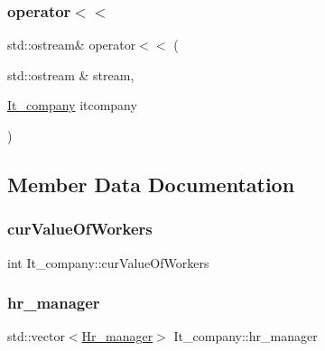 \subsubsection{\texorpdfstring{operator$<$$<$}{operator<<}}
{\footnotesize\ttfamily std\+::ostream\& operator$<$$<$ (\begin{DoxyParamCaption}\item[{std\+::ostream \&}]{stream,  }\item[{\hyperlink{class_it__company}{It\+\_\+company}}]{itcompany }\end{DoxyParamCaption})\hspace{0.3cm}{\ttfamily [friend]}}



\subsection{Member Data Documentation}
\hypertarget{class_it__company_ac48dbef2db2cad83837c89efdc69b9c9}{}\label{class_it__company_ac48dbef2db2cad83837c89efdc69b9c9} 
\subsubsection{\texorpdfstring{cur\+Value\+Of\+Workers}{curValueOfWorkers}}
{\footnotesize\ttfamily int It\+\_\+company\+::cur\+Value\+Of\+Workers\hspace{0.3cm}{\ttfamily [private]}}

\hypertarget{class_it__company_ae0e3f81754b1433c6dfb5ebe96f620d1}{}\label{class_it__company_ae0e3f81754b1433c6dfb5ebe96f620d1} 
\subsubsection{\texorpdfstring{hr\+\_\+manager}{hr\_manager}}
{\footnotesize\ttfamily std\+::vector$<$\hyperlink{class_hr__manager}{Hr\+\_\+manager}$>$ It\+\_\+company\+::hr\+\_\+manager}

\hypertarget{class_it__company_ac71fd3642622747e9e543b5a193ba525}{}\label{class_it__company_ac71fd3642622747e9e543b5a193ba525} 
